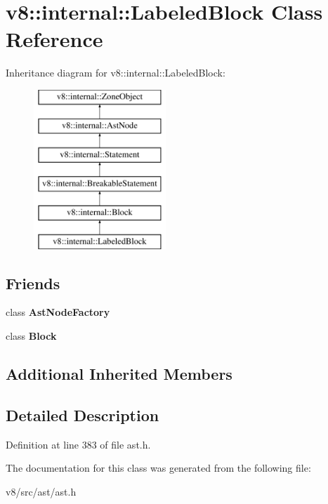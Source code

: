 \hypertarget{classv8_1_1internal_1_1LabeledBlock}{}\section{v8\+:\+:internal\+:\+:Labeled\+Block Class Reference}
\label{classv8_1_1internal_1_1LabeledBlock}
Inheritance diagram for v8\+:\+:internal\+:\+:Labeled\+Block\+:\begin{figure}[H]
\begin{center}
\leavevmode
\includegraphics[height=6.000000cm]{classv8_1_1internal_1_1LabeledBlock}
\end{center}
\end{figure}
\subsection*{Friends}
\begin{DoxyCompactItemize}
\item 
\mbox{\label{classv8_1_1internal_1_1LabeledBlock_a8d587c8ad3515ff6433eb83c578e795f}} 
class {\bfseries Ast\+Node\+Factory}
\item 
\mbox{\label{classv8_1_1internal_1_1LabeledBlock_ac2af81cbc457d21a00f09f5e7e5c4ddf}} 
class {\bfseries Block}
\end{DoxyCompactItemize}
\subsection*{Additional Inherited Members}


\subsection{Detailed Description}


Definition at line 383 of file ast.\+h.



The documentation for this class was generated from the following file\+:\begin{DoxyCompactItemize}
\item 
v8/src/ast/ast.\+h\end{DoxyCompactItemize}

